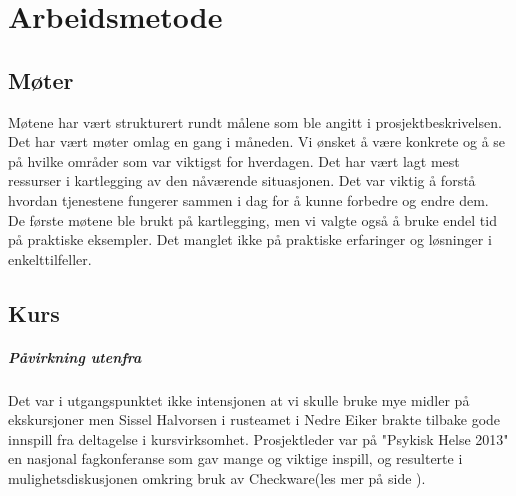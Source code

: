 \documentclass[11pt]{report} %
\begin{document}
                \chapter{Arbeidsmetode}\label{chap:meto}
                  \section{Møter}
                      Møtene har vært strukturert rundt målene som ble angitt i prosjektbeskrivelsen. Det har vært møter omlag en gang i måneden. Vi ønsket å være konkrete og å se på hvilke områder som var viktigst for hverdagen\cite{ProPlan-1}.
                      Det har vært lagt mest ressurser i kartlegging av den nåværende situasjonen. Det var viktig å forstå hvordan tjenestene fungerer sammen i dag for å kunne forbedre og endre dem.\\
                      De første møtene ble brukt på kartlegging, men vi valgte også å bruke endel tid på praktiske eksempler. Det manglet ikke på praktiske erfaringer og løsninger i enkelttilfeller. 
                  \section{Kurs}
                    \paragraph{Påvirkning utenfra\\}
                      Det var i utgangspunktet ikke intensjonen at vi skulle bruke mye midler på ekskursjoner men Sissel Halvorsen i rusteamet i Nedre Eiker brakte tilbake gode innspill fra deltagelse i kursvirksomhet. Prosjektleder var på "Psykisk Helse 2013" en nasjonal fagkonferanse som gav mange og viktige inspill, og resulterte i mulighetsdiskusjonen omkring bruk av Checkware(les mer på side \pageref{sec:agr_6}).
\end{document}
